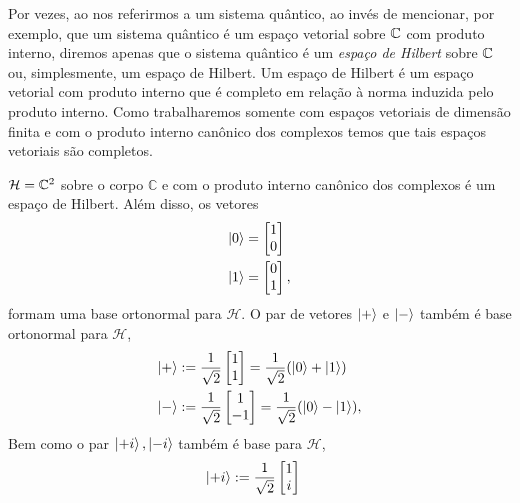 Por vezes, ao nos referirmos a um sistema quântico, ao invés de mencionar, por exemplo, que um sistema quântico é um espaço vetorial sobre $\mathbb{C}$ com produto interno, diremos apenas que o sistema quântico é um \emph{espaço de Hilbert} sobre $\mathbb{C}$ ou, simplesmente, um espaço de Hilbert. Um espaço de Hilbert é um espaço vetorial com produto interno que é completo em relação à norma induzida pelo produto interno. Como trabalharemos somente com espaços vetoriais de dimensão finita e com o produto interno canônico dos complexos temos que tais espaços vetoriais são completos.

\begin{example}\label{defket0}
	$\mathcal{H}=\mathbb{C}^2$ sobre o corpo $\mathbb{C}$ e com o produto interno canônico dos complexos é um espaço de Hilbert. Além disso, os vetores
	\begin{align*}
		\ket{0} &= \begin{bmatrix}
			1 \\
			0 \\
		\end{bmatrix} \\
		\ket{1} &= \begin{bmatrix}
			0 \\
			1 \\
		\end{bmatrix},
	\end{align*}
	formam uma base ortonormal para $\mathcal{H}$. O par de vetores $\ket{+}$ e $\ket{-}$ também é base ortonormal para $\mathcal{H}$,
	\begin{align*}
		\ket{+} &:= \frac{1}{\sqrt{2}}\begin{bmatrix}
			1 \\
			1 \\
		\end{bmatrix} = \frac{1}{\sqrt{2}}(\ket{0} + \ket{1}) \\
		\ket{-} &:= \frac{1}{\sqrt{2}}\begin{bmatrix}
			1 \\
			-1 \\
		\end{bmatrix} = \frac{1}{\sqrt{2}}(\ket{0} - \ket{1}), \\
	\end{align*}
	Bem como o par $\ket{+i}, \ket{-i}$ também é base para $\mathcal{H}$,
	\begin{align*}
		\ket{+i} &:= \frac{1}{\sqrt{2}}\begin{bmatrix}
			1 \\
			i \\

\end{bmatrix}
\end{align*}
\end{example}
